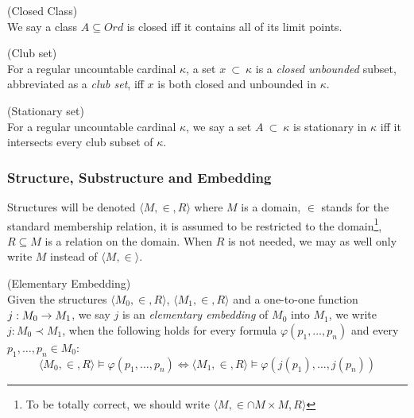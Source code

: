 \begin{definition}{(Closed Class)}\label{def:closed_class}\\
We say a class $A \subseteq Ord$ is closed iff it contains all of its limit points.
\end{definition}

\begin{definition}{(Club set)}\label{def:club_set}\\
For a regular uncountable cardinal $\kappa$, a set $x\ \subset\ \kappa$ is a \emph{closed unbounded} subset, abbreviated as a \emph{club set}, iff $x$ is both closed and unbounded in $\kappa$.
\end{definition}

\begin{definition}{(Stationary set)}\label{def:stationary_set}\\
For a regular uncountable cardinal $\kappa$, we say a set $A\ \subset\ \kappa$ is stationary in $\kappa$ iff it intersects every club subset of $\kappa$.
\end{definition}

\subsubsection{Structure, Substructure and Embedding}

Structures will be denoted $\langle M, \in, R \rangle$ where $M$ is a domain, $\in$ stands for the standard membership relation, it is assumed to be restricted to the domain\footnote{To be totally correct, we should write $\langle M, \in \cap M \times M, R \rangle$}, $R \subseteq M$ is a relation on the domain. When $R$ is not needed, we may as well only write $M$ instead of $\langle M, \in \rangle$.

\begin{definition}{(Elementary Embedding)}\label{def:elementary_embedding}\\
Given the structures $\langle M_0, \in, R \rangle$, $\langle M_1, \in, R \rangle$ and a one-to-one function $j: M_0 \rightarrow M_1$, we say $j$ is an \emph{elementary embedding} of $M_0$ into $M_1$, we write $j: M_0 \prec M_1$, when the following holds for every formula $\varphi(p_1, \ldots, p_n)$ and every $p_1, \ldots, p_n \in M_0$:
\begin{equation}
\langle M_0, \in, R \rangle \models \varphi(p_1, \ldots, p_n) \iff \langle M_1, \in, R \rangle  \models \varphi(j(p_1), \ldots, j(p_n))
\end{equation}
\end{definition}


